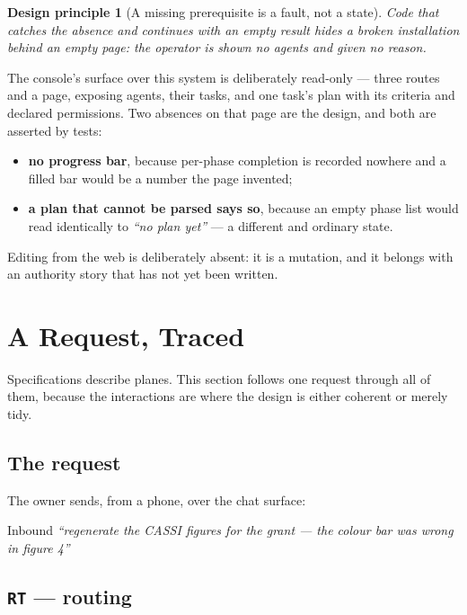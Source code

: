\documentclass[11pt]{article}
\newtheorem{principle}{Design principle}
\newcommand{\code}[1]{\texttt{\small #1}}
\begin{document}
\begin{principle}[A missing prerequisite is a fault, not a state]
\label{prin:prereq}
Code that catches the absence and continues with an empty result hides a broken installation behind an empty page: the operator is shown \emph{no agents} and given no reason.
\end{principle}

The console's surface over this system is deliberately read-only --- three routes and a page, exposing agents, their tasks, and one task's plan with its criteria and declared permissions. Two absences on that page are the design, and both are asserted by tests:

\begin{itemize}
\item \textbf{no progress bar}, because per-phase completion is recorded nowhere and a filled bar would be a number the page invented;
\item \textbf{a plan that cannot be parsed says so}, because an empty phase list would read identically to \emph{``no plan yet''} --- a different and ordinary state.
\end{itemize}

Editing from the web is deliberately absent: it is a mutation, and it belongs with an authority story that has not yet been written.

\section{A Request, Traced}
\label{sec:traced}

Specifications describe planes. This section follows one request through all of them, because the interactions are where the design is either coherent or merely tidy.

\subsection{The request}

The owner sends, from a phone, over the chat surface:

\begin{specbox}{Inbound}
\emph{``regenerate the CASSI figures for the grant --- the colour bar was wrong in figure 4''}
\end{specbox}

\subsection{\code{RT} --- routing}
\end{document}

